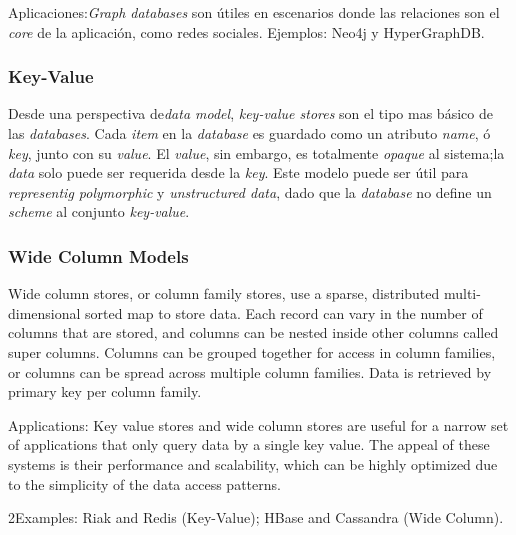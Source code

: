 Aplicaciones:\textit{Graph databases} son útiles en escenarios donde las relaciones son el \textit{core} de la aplicación, como redes sociales.
Ejemplos: Neo4j y HyperGraphDB.

\subsubsection*{Key-Value}

Desde una perspectiva de\textit{data model}, \textit{key-value stores} son el tipo mas básico de las \textit{ databases}. Cada \textit{item} en la \textit{database} es guardado como un atributo \textit{name}, ó \textit{key}, junto con su \textit{value}. El \textit{value}, sin embargo, es totalmente \textit{opaque} al sistema;la \textit{data} solo puede ser requerida desde la \textit{key}. Este modelo puede ser útil para \textit{representig polymorphic} y \textit{unstructured data}, dado que la \textit{database} no define un \textit{scheme} al conjunto \textit{key-value}.

\subsubsection*{Wide Column Models}

Wide column stores, or column family stores, use a sparse,
distributed multi-dimensional sorted map to store data. Each record can vary in the number of columns that are stored, and columns can be nested inside other columns called super columns. Columns can be grouped together for access in column families, or columns can be spread across multiple column families. Data is retrieved by primary key per column family.

Applications: Key value stores and wide column stores are useful for a narrow set of applications that only query data by a single key value. The appeal of these systems is their performance and scalability, which can be highly optimized due to the simplicity of the data access patterns.

2Examples: Riak and Redis (Key-Value); HBase and Cassandra (Wide Column).





